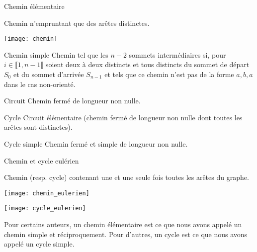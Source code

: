 \begin{defi}{Chemin élémentaire}

\noindent\begin{minipage}{.7\linewidth}
Chemin n'empruntant que des arêtes distinctes.
\end{minipage} \hfill
\begin{minipage}{.25\linewidth}
\texttt{[image: chemin]}
\end{minipage}
\end{defi}

\begin{defi}{Chemin simple}
Chemin tel que les $n - 2$ sommets intermédiaires si, pour $i \in \llbracket 1, n-1\llbracket$ soient
deux à deux distincts et tous distincts du sommet de départ $S_0$ et du sommet d’arrivée $S_{n-1}$ et tels
que ce chemin n’est pas de la forme $a, b, a$ dans le cas non-orienté.
\end{defi}

\begin{defi}{Circuit}
Chemin fermé de longueur non nulle.
\end{defi}


\begin{defi}{Cycle}
Circuit élémentaire (chemin fermé de longueur non nulle dont toutes les arêtes sont distinctes).
\end{defi}

\begin{defi}{Cycle simple} 
Chemin fermé et simple de longueur non nulle.
\end{defi}

\begin{defi}{Chemin et cycle eulérien}

\noindent\begin{minipage}{.55\linewidth}
Chemin (resp. cycle) contenant une et une seule fois toutes les arêtes du graphe.
\end{minipage} \hfill
\begin{minipage}{.2\linewidth}
\texttt{[image: chemin\_eulerien]}
\end{minipage}
 \hfill
\begin{minipage}{.2\linewidth}
\texttt{[image: cycle\_eulerien]}
\end{minipage}
\end{defi}

\begin{rem}
Pour certains auteurs, un chemin élémentaire est ce que nous avons appelé un chemin simple et réciproquement. Pour d’autres, un cycle est ce que nous avons appelé un cycle simple.
\end{rem}

